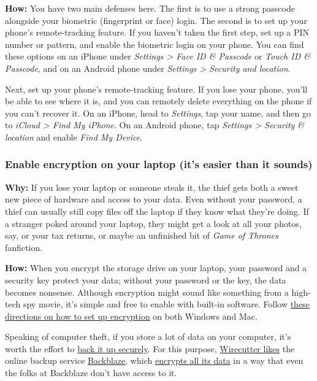 \textbf{How:} You have two main defenses here. The first is to use a
strong passcode alongside your biometric (fingerprint or face) login.
The second is to set up your phone's remote-tracking feature. If you
haven't taken the first step, set up a PIN number or pattern, and enable
the biometric login on your phone. You can find these options on an
iPhone under \emph{Settings \textgreater{} Face ID \& Passcode} or
\emph{Touch ID \& Passcode}, and on an Android phone under
\emph{Settings \textgreater{} Security and location}.

Next, set up your phone's remote-tracking feature. If you lose your
phone, you'll be able to see where it is, and you can remotely delete
everything on the phone if you can't recover it. On an iPhone, head to
\emph{Settings}, tap your name, and then go to \emph{iCloud
\textgreater{} Find My iPhone}. On an Android phone, tap \emph{Settings
\textgreater{} Security \& location} and enable \emph{Find My Device}.~

\hypertarget{enable-encryption-on-your-laptop-its-easier-than-it-sounds}{%
\subsubsection{Enable encryption on your laptop (it's easier than it
sounds)}\label{enable-encryption-on-your-laptop-its-easier-than-it-sounds}}

\textbf{Why:} If you lose your laptop or someone steals it, the thief
gets both a sweet new piece of hardware and access to your data. Even
without your password, a thief can usually still copy files off the
laptop if they know what they're doing. If a stranger poked around your
laptop, they might get a look at all your photos, say, or your tax
returns, or maybe an unfinished bit of \emph{Game of Thrones}
fanfiction.~

\textbf{How:} When you encrypt the storage drive on your laptop, your
password and a security key protect your data; without your password or
the key, the data becomes nonsense. Although encryption might sound like
something from a high-tech spy movie, it's simple and free to enable
with built-in software. Follow
\href{https://www.nytimes3xbfgragh.onion/2018/03/13/smarter-living/how-to-encrypt-your-computers-data.html}{these
directions on how to set up encryption} on both Windows and Mac.~

Speaking of computer theft, if you store a lot of data on your computer,
it's worth the effort to
\href{https://thewirecutter.com/reviews/how-to-back-up-your-computer/}{back
it up securely}. For this purpose,
\href{https://thewirecutter.com/reviews/best-online-backup-service/}{Wirecutter
likes} the online backup service
\href{https://www.backblaze.com/cloud-backup.html}{Backblaze}, which
\href{https://www.backblaze.com/backup-encryption.html}{encrypts all its
data} in a way that even the folks at Backblaze don't have access to
it.~

